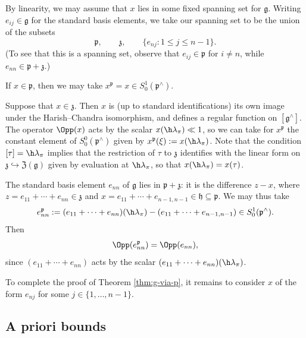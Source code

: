 By linearity, we may assume that $x$ lies in some fixed spanning set for $\mathfrak{g}$.  Writing $e_{i j} \in \mathfrak{g}$ for the standard basis elements, we take our spanning set to be the union of the subsets
\begin{equation*}
  \mathfrak{p},
  \qquad \mathfrak{z},
  \qquad \{ e_{n j} : 1 \leq j \leq n-1 \}.
\end{equation*}
(To see that this is a spanning set, observe that $e_{i j} \in \mathfrak{p}$ for $i \neq n$, while $e_{nn} \in \mathfrak{p} + \mathfrak{z}$.)

If $x \in \mathfrak{p}$, then we may take $x^\mathfrak{p} = x \in S^1_0(\mathfrak{p}^\wedge)$.

Suppose that $x \in \mathfrak{z}$.  Then $x$ is (up to standard identifications) its own image under the Harish--Chandra isomorphism, and defines a regular function on $[\mathfrak{g}^\wedge]$.  The operator $\Opp(x)$ acts by the scalar $x(\h \lambda_\pi) \ll 1$, so we can take for $x^\mathfrak{p}$ the constant element of $S^0_0(\mathfrak{p}^\wedge)$ given by $x^\mathfrak{p}(\xi) := x(\h \lambda_\pi)$.  Note that the condition $[\tau] = \h \lambda_\pi$ implies that the restriction of $\tau$ to $\mathfrak{z}$ identifies with the linear form on $\mathfrak{z} \hookrightarrow \mathfrak{Z}(\mathfrak{g})$ given by evaluation at $\h \lambda_\pi$, so that $x(\h \lambda_\pi) = x(\tau)$.

The standard basis element $e_{n n}$ of $\mathfrak{g}$ lies in $\mathfrak{p} + \mathfrak{z}$: it is the difference $z - x$, where $z = e_{1 1} + \dotsb + e_{n n} \in \mathfrak{z}$ and $x = e_{1 1} + \dotsb + e_{n-1,n-1} \in \mathfrak{h} \subseteq \mathfrak{p}$.  We may thus take
\[
  e_{n n}^{\mathfrak{p}} := (e_{1 1} + \dotsb + e_{n n})(\h \lambda_\pi) - (e_{1 1} + \dotsb + e_{n-1,n-1}) \in S^1_0(\mathfrak{p}^\wedge).
\]
Then
\begin{equation}\label{eq:cui1fz583k}
  \Opp(e_{n n}^{\mathfrak{p}}) = \Opp(e_{n n}),
\end{equation}
since $(e_{1 1} + \dotsb + e_{n n})$ acts by the scalar $(e_{1 1} + \dotsb + e_{n n})(\h \lambda_\pi)$.

To complete the proof of Theorem \ref{thm:g-via-p}, it remains to consider $x$ of the form $e_{n j}$ for some $j \in \{1,\dotsc, n-1\}$.


\subsection{A priori bounds}\label{sec:empha-priori-bounds}

